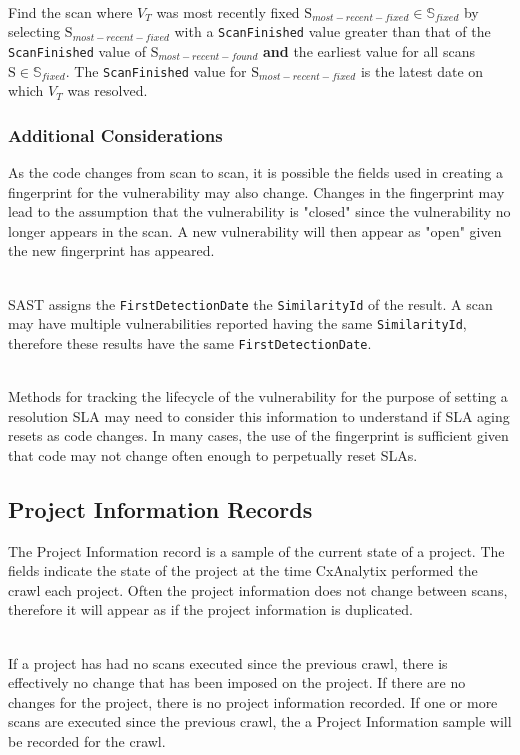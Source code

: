 \noindent\\Find the scan where $V_T$ was most recently fixed $\text{S}_{most-recent-fixed}\in\mathbb{S}_{fixed}$
by selecting 
$\text{S}_{most-recent-fixed}$ with a \texttt{ScanFinished} value greater than that of 
the \texttt{ScanFinished} value of $\text{S}_{most-recent-found}$
\textbf{and} the earliest value for all scans
$\text{S}\in\mathbb{S}_{fixed}$.
The \texttt{ScanFinished} value for $\text{S}_{most-recent-fixed}$ is the latest date on which
$V_T$ was resolved.

\subsubsection{Additional Considerations}

As the code changes from scan to scan, it is possible the fields used in creating a fingerprint for the vulnerability may also change.  Changes in the fingerprint may 
lead to the assumption that the vulnerability is "closed" since the vulnerability no longer appears in the scan.  A new vulnerability will then appear as "open" given 
the new fingerprint has appeared.

\noindent\\SAST assigns the \texttt{FirstDetectionDate} the \texttt{SimilarityId} of the result.  A scan may have multiple vulnerabilities reported having the 
same \texttt{SimilarityId}, therefore these results have the same \texttt{FirstDetectionDate}.  

\noindent\\Methods for tracking the lifecycle of the vulnerability for the purpose of setting a resolution SLA may need to consider this information to understand
if SLA aging resets as code changes.  In many cases, the use of the fingerprint is sufficient given that code may not change often enough to perpetually reset SLAs.


\subsection{Project Information Records}

The Project Information record is a sample of the current state of a project.  The fields indicate the state of the project at the time CxAnalytix performed the 
crawl each project.  Often the project information does not change between scans, therefore it will appear as if the project information is duplicated.

\noindent\\If a project has had no scans executed since the previous crawl, there is effectively no change that has been imposed on the project.  If there are
no changes for the project, there is no project information recorded.  If one or more
scans are executed since the previous crawl, the a Project Information sample will be recorded for the crawl.

